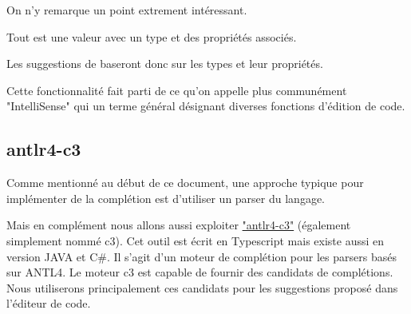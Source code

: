 \documentclass[
    iict, %
    il, %
]{heig-tb}
\begin{document}
On n'y remarque un point extrement intéressant.

Tout est une valeur avec un type et des propriétés associés.

Les suggestions de baseront donc sur les types et leur propriétés.










Cette fonctionnalité fait parti de ce qu'on appelle plus communément "IntelliSense" \cite{intelliSense} qui un terme général désignant diverses fonctions d'édition de code.


\subsection{antlr4-c3}

Comme mentionné au début de ce document, une approche typique pour implémenter de la complétion est d'utiliser un parser du langage.

Mais en complément nous allons aussi exploiter \href{https://github.com/mike-lischke/antlr4-c3}{"antlr4-c3"} (également simplement nommé c3).
Cet outil est écrit en Typescript mais existe aussi en version JAVA et C\#.
Il s'agit d'un moteur de complétion pour les parsers basés sur ANTL4. Le moteur c3 est capable de fournir des candidats de complétions.
Nous utiliserons principalement ces candidats pour les suggestions proposé dans l'éditeur de code.
\end{document}
